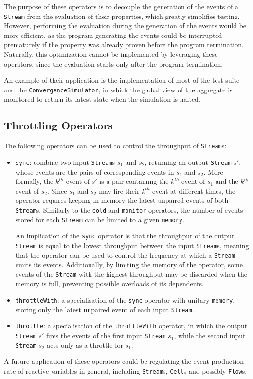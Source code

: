 The purpose of these operators is to decouple the generation of the events of a
\texttt{Stream} from the evaluation of their properties, which greatly
simplifies testing. However, performing the evaluation during the generation of
the events would be more efficient, as the program generating the events could
be interrupted prematurely if the property was already proven before the
program termination. Naturally, this optimization cannot be implemented by
leveraging these operators, since the evaluation starts only after the program
termination.

An example of their application is the implementation of most of the test suite
and the \texttt{ConvergenceSim\-ulator}, in which the global view of the
aggregate is monitored to return its latest state when the simulation is
halted.

\subsection{Throttling Operators}

The following operators can be used to control the throughput of
\texttt{Stream}s:
\begin{itemize}
  \item \texttt{sync}: combine two input \texttt{Stream}s $s_1$ and $s_2$,
        returning an output \texttt{Stream} $s'$, whose events are the pairs of
        corresponding events in $s_1$ and $s_2$. More formally, the $k^{th}$
        event of $s'$ is a pair containing the $k^{th}$ event of $s_1$ and the
        $k^{th}$ event of $s_2$. Since $s_1$ and $s_2$ may fire their $k^{th}$
        event at different times, the operator requires keeping in memory the
        latest unpaired events of both \texttt{Stream}s. Similarly to the
        \texttt{cold} and \texttt{monitor} operators, the number of events
        stored for each \texttt{Stream} can be limited to a given
        \texttt{memory}.

        An implication of the \texttt{sync} operator is that the throughput of
        the output \texttt{Stream} is equal to the lowest throughput between
        the input \texttt{Stream}s, meaning that the operator can be used to
        control the frequency at which a \texttt{Stream} emits its events.
        Additionally, by limiting the memory of the operator, some events of
        the \texttt{Stream} with the highest throughput may be discarded when
        the memory is full, preventing possible overloads of its dependents.
  \item \texttt{throttleWith}: a specialisation of the \texttt{sync} operator
        with unitary \texttt{memory}, storing only the latest unpaired event of
        each input \texttt{Stream}.
  \item \texttt{throttle}: a specialisation of the \texttt{throttleWith}
        operator, in which the output \texttt{Stream} $s'$ fires the events of
        the first input \texttt{Stream} $s_1$, while the second input
        \texttt{Stream} $s_2$ acts only as a throttle for $s_1$.
\end{itemize}

A future application of these operators could be regulating the event
production rate of reactive variables in general, including \texttt{Stream}s,
\texttt{Cell}s and possibly \texttt{Flow}s.
